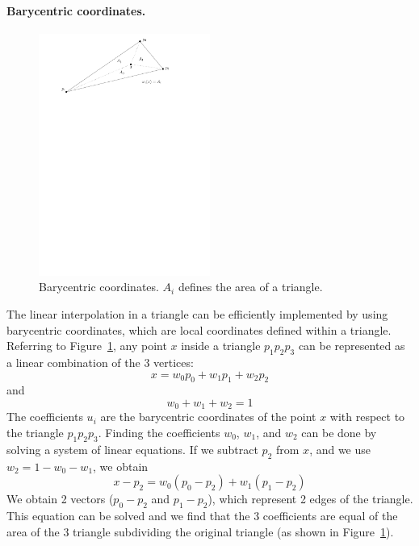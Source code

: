 \paragraph{Barycentric coordinates.}
\begin{figure}
  \centering
  \includegraphics[width=0.5\textwidth]{figs/li}
  \caption{Barycentric coordinates. $A_i$ defines the area of a triangle.} 
\label{fig:li}
\end{figure}
The linear interpolation in a triangle can be efficiently implemented by using barycentric coordinates, which are local coordinates defined within a triangle.
Referring to Figure~\ref{fig:li}, any point $x$ inside a triangle $p_1p_2p_3$ can be represented as a linear combination of the 3 vertices:
\[
  x = w_0p_0 + w_1p_1 + w_2p_2
\]
and 
\[
  w_0 + w_1 + w_2 = 1   
\]
The coefficients $u_i$ are the barycentric coordinates of the point $x$ with respect to the triangle $p_1p_2p_3$.
Finding the coefficients $w_0$, $w_1$, and $w_2$ can be done by solving a system of linear equations.
If we subtract $p_2$ from $x$, and we use $w_2 = 1 - w_0 - w_1$, we obtain
\[
  x - p_2 = w_0(p_0-p_2) + w_1(p_1 - p_2)
\]
We obtain 2 vectors ($p_0-p_2$ and $p_1-p_2$), which represent 2 edges of the triangle.
This equation can be solved and we find that the 3 coefficients are equal of the area of the 3 triangle subdividing the original triangle (as shown in Figure~\ref{fig:li}).


